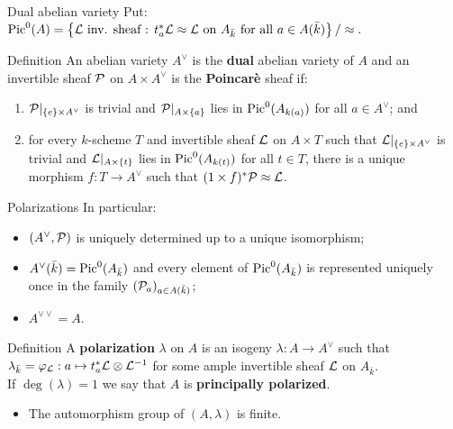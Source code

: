 \documentclass{beamer}
\begin{document}
\begin{frame}{Dual abelian variety}
  Put: $\operatorname{Pic}^0(A) = \left\lbrace{\mathcal L} \text{ inv. sheaf : }t^*_a{\mathcal L}\approx{\mathcal L} \text{ on }A_{\bar k} \text{ for all }a\in A(\bar k) \right\rbrace/\approx.$
  \begin{block}{Definition}
    An abelian variety $A^\vee$ is the \textbf{dual} abelian variety of $A$ and an invertible sheaf ${\mathcal P}$ on $A\times A^\vee$ is the \textbf{Poincar\`e} sheaf if:
    \begin{enumerate}
      \pause \item ${\mathcal P}|_{\left\lbrace e\right\rbrace\times A^\vee}$ is trivial and ${\mathcal P}|_{A\times \left\lbrace a\right\rbrace}$ lies in $\operatorname{Pic}^0(A_{k(a)})$ for all $a\in A^\vee$; and
      \pause \item for every $k$-scheme $T$ and invertible sheaf ${\mathcal L}$ on $A\times T$ such that ${\mathcal L}|_{\left\lbrace e\right\rbrace\times A^\vee}$ is trivial and ${\mathcal L}|_{A\times \left\lbrace t\right\rbrace}$ lies in $\operatorname{Pic}^0(A_{k(t)})$ for all $t\in T$, there is a unique morphism $f:T\to A^\vee$ such that $(1\times f)^*{\mathcal P}\approx {\mathcal L}$.
    \end{enumerate}
  \end{block}
\end{frame}

\begin{frame}{Polarizations}
  In particular:
  \begin{itemize}
    \item $(A^\vee,{\mathcal P})$ is uniquely determined up to a unique isomorphism;
    \item $A^\vee(\bar k) = \operatorname{Pic}^0(A_{\bar k})$ and every element of $\operatorname{Pic}^0(A_{\bar k})$ is represented uniquely once in the family $({\mathcal P}_a)_{a\in A(\bar k)}$;
    \item $A^{\vee\vee} = A$.
  \end{itemize}
\pause
  \begin{block}{Definition}
    A \textbf{polarization} $\lambda$ on $A$ is an isogeny $\lambda: A\to A^\vee$ such that $\lambda_{\bar k}={\varphi}_{\mathcal L}: a\mapsto t_a^*{\mathcal L} \otimes {\mathcal L}^{-1}$ for some ample invertible sheaf ${\mathcal L}$ on $A_{\bar k}$.\\
    If $\deg(\lambda)=1$ we say that $A$ is \textbf{principally polarized}.
  \end{block}
  \begin{itemize}
     \pause \item The automorphism group of $(A,\lambda)$ is finite.
  \end{itemize}
\end{frame}
\end{document}
